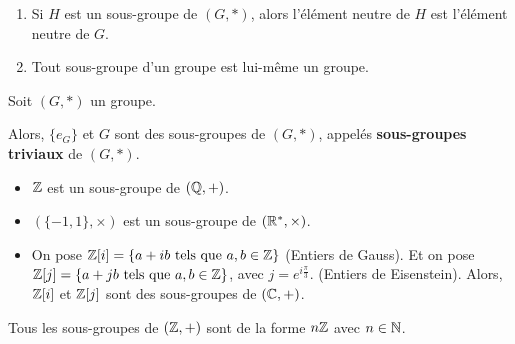 \documentclass[12pt, a4paper]{report}
\begin{document}
\begin{remark}
    \begin{enumerate}
        \item Si $H$ est un sous-groupe de $(G,*)$, alors l'élément neutre de $H$ est l'élément neutre de $G$.
        \item Tout sous-groupe d'un groupe est lui-même un groupe.
    \end{enumerate}
\end{remark}

\begin{property}
    Soit $(G,*)$ un groupe.

    Alors, $\{e_G\}$ et $G$ sont des sous-groupes de $(G,*)$, appelés \textbf{sous-groupes triviaux} de $(G,*)$.
\end{property}

\begin{example}
    \begin{itemize}
        \item $\mathbb{Z}$ est un sous-groupe de $(\mathbb{Q},+)$.
        \item $(\{-1,1\},\times)$ est un sous-groupe de $(\mathbb{R}^*,\times)$.
        \item On pose $\mathbb{Z}[i]=\{a+ib \text{ tels que } a,b\in \mathbb{Z}\}$ (Entiers de Gauss).
            Et on pose $\mathbb{Z}[j] = \{a+jb \text{ tels que } a,b\in\mathbb{Z}\}$, avec $j=e^{i\frac{\pi}3}$. (Entiers de Eisenstein). 
            Alors, $\mathbb{Z}[i]$ et $\mathbb{Z}[j]$ sont des sous-groupes de $(\mathbb{C},+)$.
    \end{itemize}
\end{example}

\begin{property}
    Tous les sous-groupes de $(\mathbb{Z},+)$ sont de la forme $n\mathbb{Z}$ avec $n\in\mathbb{N}$.
\end{property}
\end{document}
